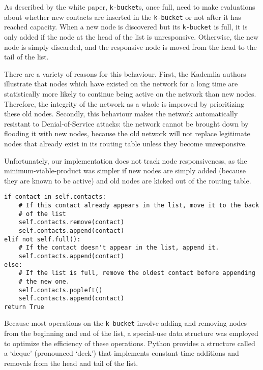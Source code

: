 \documentclass[12pt]{report}
\newcommand{\code}[1]{\colorbox{codegray}{\texttt{#1}}}
\begin{document}
                As described by the white
                paper, \code{k-bucket}s, once full, need to make evaluations
                about whether new contacts are inserted in the \code{k-bucket}
                or not after it has reached capacity.  When a new node is
                discovered but its \code{k-bucket} is full, it is only added if
                the node at the head of the list is unresponsive.  Otherwise,
                the new node is simply discarded, and the responsive node is
                moved from the head to the tail of the list.

                There are a variety of reasons for this behaviour.  First, the
                Kademlia authors illustrate that nodes which have existed on
                the network for a long time are statistically more likely to
                continue being active on the network than new nodes.
                Therefore, the integrity of the network as a whole is improved
                by prioritizing these old nodes.  Secondly, this behaviour
                makes the network automatically resistant to Denial-of-Service
                attacks: the network cannot be brought down by flooding it with
                new nodes, because the old network will not replace legitimate
                nodes that already exist in its routing table unless they
                become unresponsive.

                Unfortunately, our implementation does not track node
                responsiveness, as the minimum-viable-product was simpler if
                new nodes are simply added (because they are known to be
                active) and old nodes are kicked out of the routing table.

\begin{lstlisting}[caption=KBucket.add(), label=kbucket_add]
if contact in self.contacts:
    # If this contact already appears in the list, move it to the back
    # of the list
    self.contacts.remove(contact)
    self.contacts.append(contact)
elif not self.full():
    # If the contact doesn't appear in the list, append it.
    self.contacts.append(contact)
else:
    # If the list is full, remove the oldest contact before appending
    # the new one.
    self.contacts.popleft()
    self.contacts.append(contact)
return True
\end{lstlisting}
            Because most operations on the \code{k-bucket} involve adding and
            removing nodes from the beginning and end of the list, a
            special-use data structure was employed to optimize the efficiency
            of these operations.  Python provides a structure called a `deque'
            (pronounced `deck') that implements constant-time additions and
            removals from the head and tail of the list.
\end{document}
